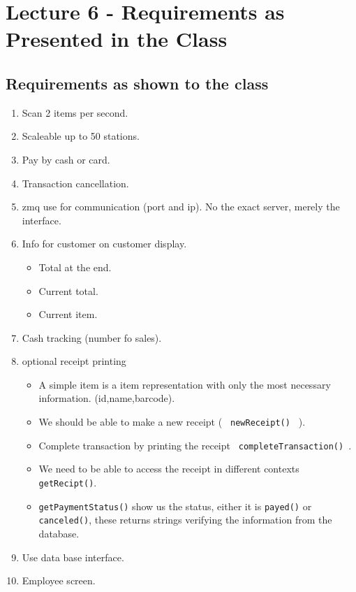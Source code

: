 \documentclass{article}
\begin{document}
\section*{Lecture 6 - Requirements as Presented in the Class}%
\label{sec:lecture_6_requirements_as_presented_in_the_class}

\subsection*{Requirements as shown to the class}%

\begin{enumerate}
	\item Scan 2 items per second.
	\item Scaleable up to 50 stations.
	\item Pay by cash or card.
	\item Transaction cancellation.
	\item zmq use for communication (port and ip). No the exact server, merely the interface.
	\item Info for customer on customer display.
		\begin{itemize}
			\item Total at the end.
			\item Current total.
			\item Current item.
		\end{itemize}
	\item Cash tracking (number fo sales).
	\item optional receipt printing
		\begin{itemize}
			\item A simple item is a item representation with only the most necessary information. (id,name,barcode).
			\item We should be able to make a new receipt ( \texttt{ newReceipt() } ).
			\item Complete transaction by printing the receipt \texttt{ completeTransaction() }.
			\item We need to be able to access the receipt in different contexts \texttt{getRecipt()}.
			\item \texttt{getPaymentStatus()} show us the status, either it is \texttt{payed()} or \texttt{canceled()}, these returns strings verifying the
				information from the database.
		\end{itemize}
	\item Use data base interface.
	\item Employee screen. 

\end{enumerate}
\end{document}
